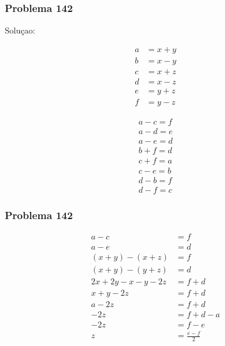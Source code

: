 \documentclass{beamer}
\begin{document}
\begin{frame}
    \frametitle{Problema 142}
    Soluçao:


    \begin{minipage}[b]{0.45\linewidth}
        \begin{align}
            a & = x + y \\
            b & = x - y \\
            c & = x + z \\
            d & = x - z \\
            e & = y + z \\
            f & = y - z
        \end{align}
    \end{minipage}
    \begin{minipage}[b]{0.45\linewidth}
        \begin{align}
            a - c = f \\
            a - d = e \\
            a - e = d \\
            b + f = d \\
            c + f = a \\
            c - e = b \\
            d - b = f \\
            d - f = c
        \end{align}
    \end{minipage}
\end{frame}


\begin{frame}
    \frametitle{Problema 142}

    \begin{align}
        a - c              &= f\\
        a - e              &= d\\
        (x+y) - (x+z)      &= f\\
        (x+y) - (y+z)      &= d\\
        2x + 2y - x -y -2z &= f+d\\
        x +y -2z           &= f+d\\
        a -2z              &= f+d\\
        -2z                &= f+d-a\\
        -2z                &= f-e \\
        z                  &= \frac{e-f}{2}
    \end{align}
\end{frame}
\end{document}
